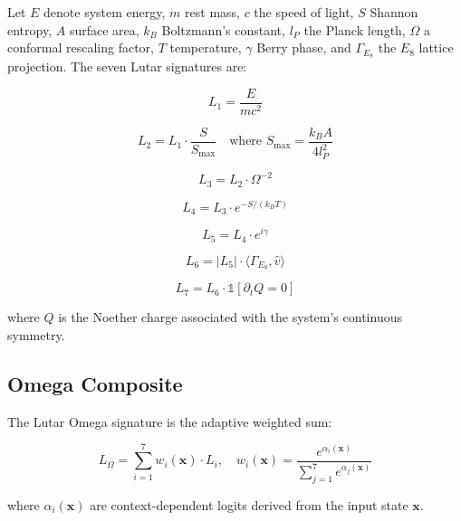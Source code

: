 \documentclass[11pt]{article}
\theoremstyle{plain}
\begin{document}
Let \( E \) denote system energy, \( m \) rest mass, \( c \) the speed of light, \( S \) Shannon entropy, \( A \) surface area, \( k_B \) Boltzmann's constant, \( l_P \) the Planck length, \( \Omega \) a conformal rescaling factor, \( T \) temperature, \( \gamma \) Berry phase, and \( \Gamma_{E_8} \) the \( E_8 \) lattice projection. The seven Lutar signatures are:

\begin{equation}
L_1 = \frac{E}{mc^2}
\end{equation}

\begin{equation}
L_2 = L_1 \cdot \frac{S}{S_{\max}} \quad \text{where } S_{\max} = \frac{k_B A}{4 l_P^2}
\end{equation}

\begin{equation}
L_3 = L_2 \cdot \Omega^{-2}
\end{equation}

\begin{equation}
L_4 = L_3 \cdot e^{-S/(k_B T)}
\end{equation}

\begin{equation}
L_5 = L_4 \cdot e^{i\gamma}
\end{equation}

\begin{equation}
L_6 = |L_5| \cdot \langle \Gamma_{E_8}, \hat{v} \rangle
\end{equation}

\begin{equation}
L_7 = L_6 \cdot \mathbb{1}[\partial_t Q = 0]
\end{equation}

where \( Q \) is the Noether charge associated with the system's continuous symmetry.

\subsection{Omega Composite}

The Lutar Omega signature is the adaptive weighted sum:

\begin{equation}
L_\Omega = \sum_{i=1}^{7} w_i(\mathbf{x}) \cdot L_i, \quad w_i(\mathbf{x}) = \frac{e^{\alpha_i(\mathbf{x})}}{\sum_{j=1}^{7} e^{\alpha_j(\mathbf{x})}}
\end{equation}

where \( \alpha_i(\mathbf{x}) \) are context-dependent logits derived from the input state \( \mathbf{x} \).
\end{document}
